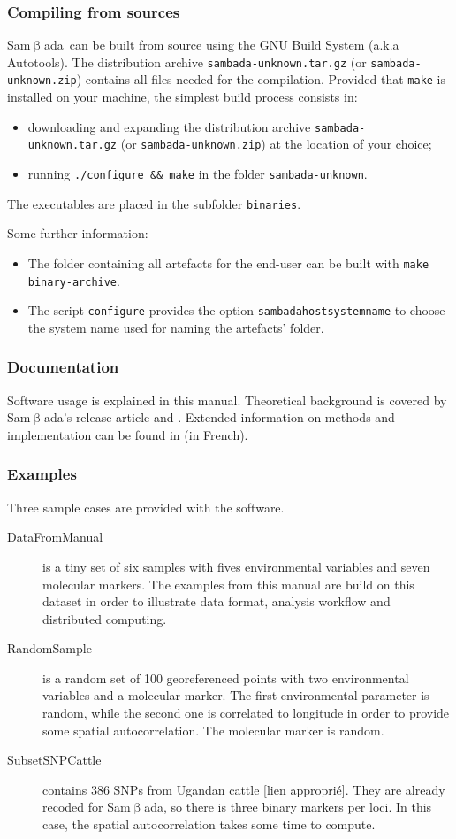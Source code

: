 \documentclass[a4paper,11pt]{article}
\newcommand{\versionnumber}{unknown}
\newcommand{\smb}{\textsf{Sam$\upbeta$ada}}
\newcommand{\prog}[1]{\texttt{#1}}
\begin{document}
\subsubsection*{Compiling from sources}
\smb\ can be built from source using the GNU Build System (a.k.a Autotools).
The distribution archive \prog{sambada-\versionnumber.tar.gz} (or \prog{sambada-\versionnumber.zip}) contains all files needed for the compilation. 
Provided that \prog{make} is installed on your machine, the simplest build process consists in:
\begin{itemize}
\item{downloading and expanding the distribution archive \prog{sambada-\versionnumber.tar.gz} (or \prog{sambada-\versionnumber.zip}) at the location of your choice;} 
\item{running \prog{./configure \&\& make} in the folder \prog{sambada-\versionnumber}.}
\end{itemize}
The executables are placed in the subfolder \prog{binaries}.

Some further information: 
\begin{itemize}
\item{The folder containing all artefacts for the end-user can be built with \prog{make binary-archive}.}
\item{The script \prog{configure} provides the option \prog{sambadahostsystemname} to choose the system name used for naming the artefacts' folder.}
\end{itemize}

\subsubsection*{Documentation}
Software usage is explained in this manual.
Theoretical background is covered by \smb's release article \textcite{stucki:2016} and \textcite{joost:2007}.
Extended information on methods and implementation can be found in \textcite{stucki:2014} (in French).

\subsubsection*{Examples}
Three sample cases are provided with the software.
\begin{description}
\item[DataFromManual] is a tiny set of six samples with fives environmental variables and seven molecular markers.
The examples from this manual are build on this dataset in order to illustrate data format, analysis workflow and distributed computing. 
\item[RandomSample] is a random set of 100 georeferenced points with two environmental variables and a molecular marker.
The first environmental parameter is random, while the second one is correlated to longitude in order to provide some spatial autocorrelation.
The molecular marker is random.
\item[SubsetSNPCattle] contains 386 SNPs from Ugandan cattle [lien approprié].
They are already recoded for \smb, so there is three binary markers per loci.
In this case, the spatial autocorrelation takes some time to compute.
\end{description}
\end{document}
